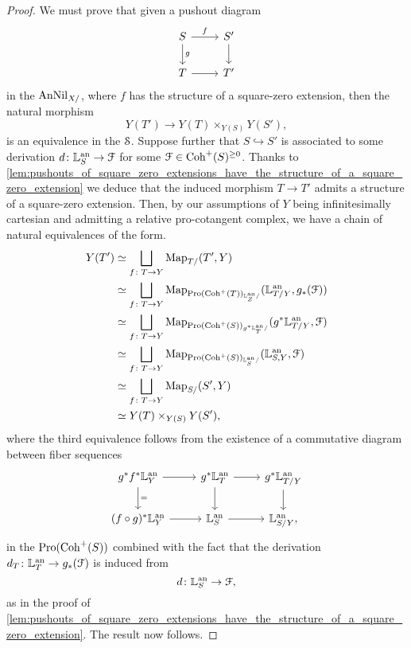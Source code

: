 \documentclass[10pt,a4paper,reqno]{amsart} %
\theoremstyle{plain}
\theoremstyle{definition}
\theoremstyle{remark}
\numberwithin{equation}{section}
\begin{document}
\begin{proof}
    We must prove that given a pushout diagram
        \[
        \begin{tikzcd}
            S \ar{r}{f} \ar{d}{g} & S' \ar{d} \\
            T \ar{r} & T'  
        \end{tikzcd}
        \]
    in the \infcat $\mathrm{AnNil}_{X/}$, where $f$ has the structure of a square-zero extension, then the natural morphism
        \[
            Y(T') \to Y(T) \times_{Y(S)} Y(S'),  
        \]
    is an equivalence in the \infcat $\mathcal S$. Suppose further that $S \hookrightarrow S'$ is associated to some derivation
    $d \colon \mathbb L^\mathrm{an}_S \to \mathcal F$ for some $\mathcal F \in \mathrm{Coh}^+(S)^{\ge 0}$.
    Thanks to \cref{lem:pushouts_of_square_zero_extensions_have_the_structure_of_a_square_zero_extension} we deduce
    that the induced morphism $T \to T'$ admits a structure of a square-zero extension.
    Then, by our assumptions of $Y$ being infinitesimally cartesian and admitting a relative pro-cotangent complex, we have a chain of natural equivalences of the form.
        \begin{align*}
            Y(T') & \simeq \bigsqcup_{f \colon T \to Y} \operatorname{Map}_{T/ } (T', Y) \\
                  & \simeq \bigsqcup_{ f \colon T \to Y} \operatorname{Map}_{\mathrm{Pro}(\mathrm{Coh}^+(T))_{ \mathbb L^\mathrm{an}_Z / }}(\mathbb L^\mathrm{an}_{T/Y}, g_*(\mathcal F)) \\
                  & \simeq \bigsqcup_{f \colon T \to Y} \operatorname{Map}_{\mathrm{Pro}(\mathrm{Coh}^+(S))_{g^* \mathbb L^\mathrm{an}_T / }} (g^*\mathbb L^\mathrm{an}_{T/Y}, \mathcal F) \\
                  & \simeq \bigsqcup_{f \colon T \to Y } \operatorname{Map}_{\mathrm{Pro}(\mathrm{Coh}^+(S))_{\mathbb L^\mathrm{an}_S/}} (\mathbb L^\mathrm{an}_{S, Y}, \mathcal F) \\
                  & \simeq \bigsqcup_{f \colon T \to Y} \operatorname{Map}_{S/ }(S', Y) \\
                  & \simeq Y(T) \times_{Y(S)} Y(S'),
        \end{align*}
    where the third equivalence follows from the existence of a commutative diagram between fiber sequences
        \[
        \begin{tikzcd}    
            g^* f^*\bbL\an_Y \ar{r} \ar{d}{=} & g^* \bbL\an_{T} \ar{r} \ar{d} &  g^* \bbL\an_{T/Y} \ar{d} \\
            (f\circ g)^*\bbL\an_Y \ar{r} & \bbL\an_{S} \ar{r} & \bbL\an_{S/Y},
        \end{tikzcd}
        \]
    in the \infcat $\mathrm{Pro}(\mathrm{Coh}^+(S))$ combined with the fact that the derivation $d_T \colon \mathbb L^\mathrm{an}_T \to g_*(\mathcal F)$ is induced from
        \[
            d \colon \mathbb L^\mathrm{an}_S \to \mathcal F,
        \]
    as in the proof of \cref{lem:pushouts_of_square_zero_extensions_have_the_structure_of_a_square_zero_extension}. The result now follows.
\end{proof}
\end{document}
